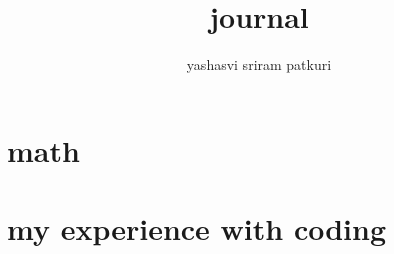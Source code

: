 \documentclass[12pt]{report}
\title{journal}
\author{yashasvi sriram patkuri}
\begin{document}
\maketitle


\tableofcontents

\part{math}







\part{my experience with coding}

\end{document}
